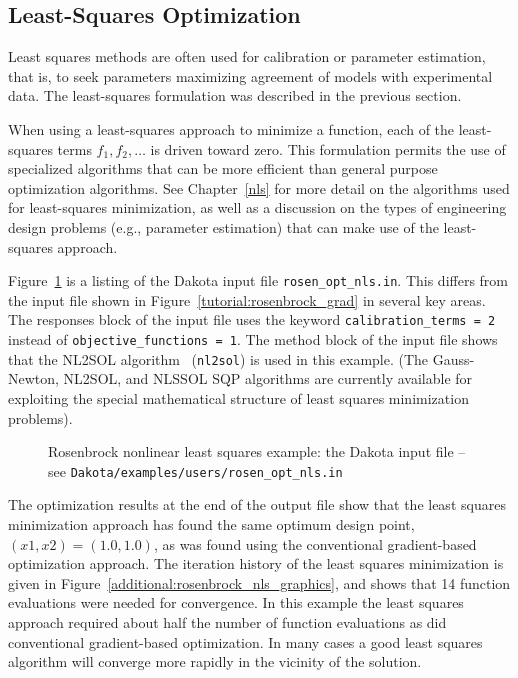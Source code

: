 \subsection{Least-Squares Optimization}\label{additional:rosenbrock:examples:nonlinear}

Least squares methods are often used for calibration or parameter
estimation, that is, to seek parameters maximizing agreement of models
with experimental data. The least-squares formulation was described in
the previous section.

When using a least-squares approach to minimize a function, each of the
least-squares terms $f_1, f_2,\ldots$ is driven toward zero. This
formulation permits the use of specialized algorithms that can be more
efficient than general purpose optimization algorithms. See
Chapter~\ref{nls} for more detail on the algorithms used for least-squares
minimization, as well as a discussion on the types of
engineering design problems (e.g., parameter estimation) that can make
use of the least-squares approach.

Figure~\ref{additional:rosenbrock_nls} is a listing of the Dakota input
file \texttt{rosen\_opt\_nls.in}. This differs from the input
file shown in Figure~\ref{tutorial:rosenbrock_grad} in several key
areas. The responses block of the input file uses the keyword
\texttt{calibration\_terms = 2} instead of
\texttt{objective\_functions = 1}.
The method block of the input file shows that the NL2SOL
algorithm~\cite{Den81} (\texttt{nl2sol}) is used in this example. (The
Gauss-Newton, NL2SOL, and NLSSOL SQP algorithms are currently
available for exploiting the special mathematical structure of least
squares minimization problems).

\begin{figure}[ht!]
  \centering
  \begin{bigbox}
    \begin{small}
    \end{small}
  \end{bigbox}
  \caption{Rosenbrock nonlinear least squares example: the Dakota input file --
see \texttt{Dakota/examples/users/rosen\_opt\_nls.in} }
  \label{additional:rosenbrock_nls}
\end{figure}

The optimization results at the end of the output file show that the least
squares minimization approach has found the same optimum design point,
$(x1,x2) = (1.0,1.0)$, as was found using the conventional
gradient-based optimization approach. The iteration history of the
least squares minimization is given in
Figure~\ref{additional:rosenbrock_nls_graphics}, and shows that 14
function evaluations were needed for convergence. In this example the
least squares approach required about half the number of function
evaluations as did conventional gradient-based optimization.
In many cases a good least squares algorithm will converge more rapidly
in the vicinity of the solution.

